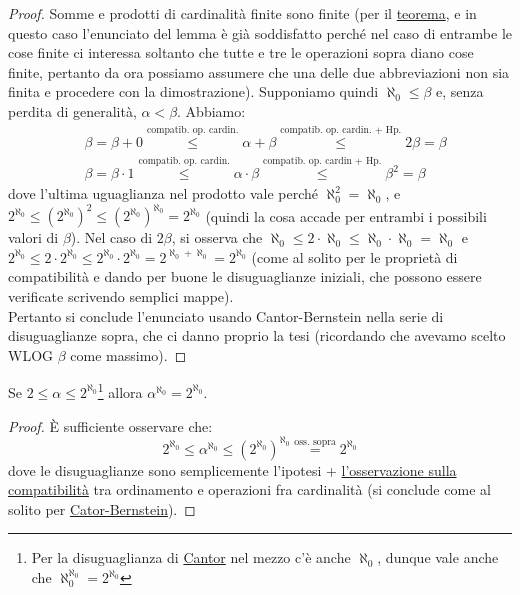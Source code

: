 \begin{proof}
	Somme e prodotti di cardinalità finite sono finite (per il \hyperref[op_card_fin]{teorema}, e in questo caso l'enunciato del lemma è già soddisfatto perché
	nel caso di entrambe le cose finite ci interessa soltanto che tutte e tre le operazioni sopra diano cose finite, pertanto da ora possiamo assumere che una delle due 
	abbreviazioni non sia finita e procedere con la dimostrazione). Supponiamo quindi $\aleph_0 \leq \beta$ e, senza perdita di generalità, $\alpha < \beta$.
	Abbiamo:
	\begin{align*}
		&\beta = \beta + 0 \overset{\text{compatib. op. cardin.}}{\leq} \alpha + \beta \overset{\text{compatib. op. cardin. + Hp.}}{\leq} 2\beta = \beta \\
		&\beta = \beta \cdot 1 \overset{\text{compatib. op. cardin.}}{\leq} \alpha \cdot \beta \overset{\text{compatib. op. cardin + Hp.}}{\leq} \beta^2 = \beta
	\end{align*}
	dove l'ultima uguaglianza nel prodotto vale perché $\aleph_0^2 = \aleph_0$, e $2^{\aleph_0} \leq (2^{\aleph_0})^2 \leq (2^{\aleph_0})^{\aleph_0}  = 2^{\aleph_0}$ (quindi la cosa accade 
	per entrambi i possibili valori di $\beta$). Nel caso di $2\beta$, si osserva che $\aleph_0 \leq 2 \cdot \aleph_0 \leq \aleph_0 \cdot \aleph_0 = \aleph_0$ e $2^{\aleph_0} \leq 2 \cdot 2^{\aleph_0} \leq 2^{\aleph_0} \cdot 2^{\aleph_0} 
	= 2^{\aleph_0 + \aleph_0} = 2^{\aleph_0}$ (come al solito per le proprietà di compatibilità e dando per buone le disuguaglianze iniziali, che possono essere verificate scrivendo semplici mappe).\\
	Pertanto si conclude l'enunciato usando Cantor-Bernstein nella serie di disuguaglianze sopra, 
	che ci danno proprio la tesi (ricordando che avevamo scelto WLOG $\beta$ come massimo).
\end{proof}

\begin{lemma}[$\alpha^{\aleph_0} = 2^{\aleph_0}$]
	Se $2 \leq \alpha \leq 2^{\aleph_0}$\footnote{Per la disuguaglianza di \hyperref[cantor]{Cantor} nel mezzo c'è anche $\aleph_0$, dunque vale anche che $\aleph_0^{\aleph_0} = 2^{\aleph_0}$} allora $\alpha^{\aleph_0} = 2^{\aleph_0}$.
\end{lemma}

\begin{proof}
	È sufficiente osservare che:
	\[ 2^{\aleph_0} \leq \alpha^{\aleph_0} \leq (2^{\aleph_0})^{\aleph_0} \overset{\text{oss. sopra}}{=} 2^{\aleph_0}
		\]
	dove le disuguaglianze sono semplicemente l'ipotesi + \hyperref[compatibilità_operazioni_cardinalità]{l'osservazione sulla compatibilità} tra ordinamento e operazioni fra cardinalità (si conclude come al solito per \hyperref[CB]{Cator-Bernstein}).
\end{proof}

